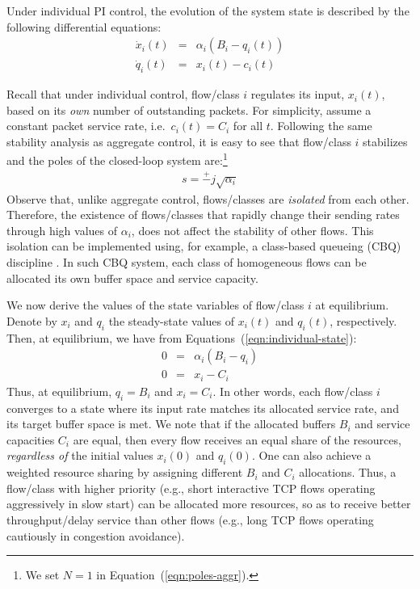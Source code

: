 \documentclass{article}
\begin{document}
Under individual PI control,
the evolution of the system state is described by the following
differential equations:
\begin{eqnarray}
\dot{x}_i(t) &=&  \alpha_i (B_i-q_i(t))  \nonumber \\ 
\dot{q}_i(t) &=&  x_i(t) - c_i(t) 
\label{eqn:individual-state}
\end{eqnarray}

Recall that under individual control,
flow/class $i$ regulates its input, $x_i(t)$,
based on its {\em own} number of outstanding packets.
For simplicity,
assume a constant packet service rate,
i.e.\ $c_i(t) = C_i$ for all $t$.
Following the same stability analysis as aggregate control,
it is easy to see that flow/class $i$ stabilizes and
the poles of the closed-loop system are:\footnote{
We set $N = 1$ in Equation~(\ref{eqn:poles-aggr}).}
\begin{eqnarray*}
	s = \stackrel{+}{-} j \sqrt{\alpha_i}
\label{eqn:individual-stability}
\end{eqnarray*}
Observe that, unlike aggregate control,
flows/classes are {\em isolated} from each other.
Therefore, 
the existence of flows/classes that
rapidly change their sending rates
through high values of $\alpha_i$, 
does not affect the stability of other flows.
This isolation can be implemented using,
for example, a class-based queueing (CBQ) discipline \cite{cbq:1995}.
In such CBQ system,
each class of homogeneous flows can be allocated
its own buffer space and service capacity.

We now derive the values of the state variables
of flow/class $i$
at equilibrium.
Denote by $x_i$ and
$q_i$ the steady-state values
of $x_i(t)$ and $q_i(t)$, respectively.
Then, at equilibrium, we have from Equations~(\ref{eqn:individual-state}):
\begin{eqnarray*}
0 &=& \alpha_i (B_i-q_i) \nonumber \\ 
0 &=&  x_i - C_i
\end{eqnarray*}
Thus, at equilibrium, $q_i = B_i$ and $x_i = C_i$.
In other words,
each flow/class $i$ converges to a state where
its input rate matches its allocated service rate,
and its target buffer space is met.
We note that 
if the allocated buffers $B_i$ and 
service capacities $C_i$ are equal,
then every flow receives an equal share
of the resources,
{\em regardless of} the initial values 
$x_i(0)$ and $q_i(0)$.
One can also achieve a weighted resource sharing
by assigning different $B_i$ and $C_i$ allocations.
Thus, a flow/class with higher priority
(e.g., short interactive TCP flows operating aggressively in slow start)
can be allocated more resources,
so as to receive better throughput/delay service
than other flows (e.g., long TCP flows operating cautiously in congestion avoidance).
\end{document}
